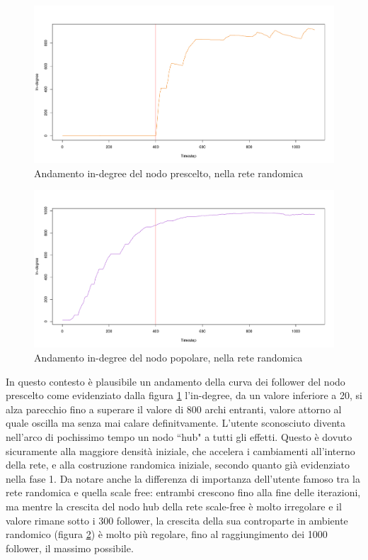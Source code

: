 \documentclass[a4paper,12pt]{article}
\begin{document}
\begin{figure}[H]
\centering
\includegraphics[scale=0.5]{images/prescelto_1000_rnd_1080_1_1.pdf}
\caption{Andamento in-degree del nodo prescelto, nella rete randomica}
\label{fig:t2}
\end{figure}
\begin{figure}[H]
\centering
\includegraphics[scale=0.5]{images/gasparri_1000_rnd_1080_1_1.pdf}
\caption{Andamento in-degree del nodo popolare, nella rete randomica}
\label{fig:g2}
\end{figure}
In questo contesto è plausibile un andamento della curva dei follower del nodo prescelto come evidenziato dalla figura \ref{fig:t2} l'in-degree, da un valore inferiore a 20, si alza parecchio fino a superare il valore di 800 archi entranti, valore attorno al quale oscilla ma senza mai calare definitvamente. L'utente sconosciuto diventa nell'arco di pochissimo tempo un nodo ``hub" a tutti gli effetti. Questo è dovuto sicuramente alla maggiore densità iniziale, che accelera i cambiamenti all'interno della rete, e alla costruzione randomica iniziale, secondo quanto già evidenziato nella fase 1. Da notare anche la differenza di importanza dell'utente famoso tra la rete randomica e quella scale free: entrambi crescono fino alla fine delle iterazioni, ma mentre la crescita del nodo hub della rete scale-free è molto irregolare e il valore rimane sotto i 300 follower, la crescita della sua controparte in ambiente randomico (figura \ref{fig:g2}) è molto più regolare, fino al raggiungimento dei 1000 follower, il massimo possibile.
\end{document}
